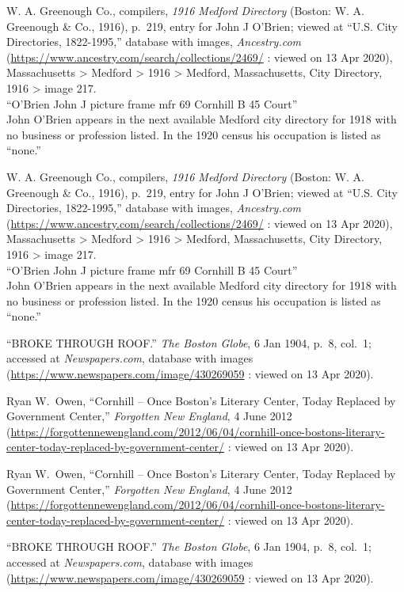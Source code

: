 \begin{thebibliography}{999}
W. A. Greenough Co., compilers, \textit{1916 Medford Directory} (Boston: W. A. Greenough \& Co., 1916), p.\ 219, entry for John J O'Brien; viewed at ``U.S. City Directories, 1822-1995,'' database with images, \textit{Ancestry.com} (\url{https://www.ancestry.com/search/collections/2469/} : viewed on 13 Apr 2020), Massachusetts > Medford > 1916 > Medford, Massachusetts, City Directory, 1916 > image 217.\\
``O'Brien John J picture frame mfr 69 Cornhill B 45 Court''\\
John O'Brien appears in the next available Medford city directory for 1918 with no business or profession listed. In the 1920 census his occupation is listed as ``none.''

W. A. Greenough Co., compilers, \textit{1916 Medford Directory} (Boston: W. A. Greenough \& Co., 1916), p.\ 219, entry for John J O'Brien; viewed at ``U.S. City Directories, 1822-1995,'' database with images, \textit{Ancestry.com} (\url{https://www.ancestry.com/search/collections/2469/} : viewed on 13 Apr 2020), Massachusetts > Medford > 1916 > Medford, Massachusetts, City Directory, 1916 > image 217.\\
``O'Brien John J picture frame mfr 69 Cornhill B 45 Court''\\
John O'Brien appears in the next available Medford city directory for 1918 with no business or profession listed. In the 1920 census his occupation is listed as ``none.''

``BROKE THROUGH ROOF.'' \textit{The Boston Globe}, 6 Jan 1904, p.\ 8, col.\ 1; accessed at \textit{Newspapers.com}, database with images (\url{https://www.newspapers.com/image/430269059} : viewed on 13 Apr 2020).

Ryan W.\ Owen, ``Cornhill -- Once Boston’s Literary Center, Today Replaced by Government Center,'' \textit{Forgotten New England}, 4 June 2012 (\url{https://forgottennewengland.com/2012/06/04/cornhill-once-bostons-literary-center-today-replaced-by-government-center/} : viewed on 13 Apr 2020).

Ryan W.\ Owen, ``Cornhill -- Once Boston’s Literary Center, Today Replaced by Government Center,'' \textit{Forgotten New England}, 4 June 2012 (\url{https://forgottennewengland.com/2012/06/04/cornhill-once-bostons-literary-center-today-replaced-by-government-center/} : viewed on 13 Apr 2020).

``BROKE THROUGH ROOF.'' \textit{The Boston Globe}, 6 Jan 1904, p.\ 8, col.\ 1; accessed at \textit{Newspapers.com}, database with images (\url{https://www.newspapers.com/image/430269059} : viewed on 13 Apr 2020).


\end{thebibliography}
